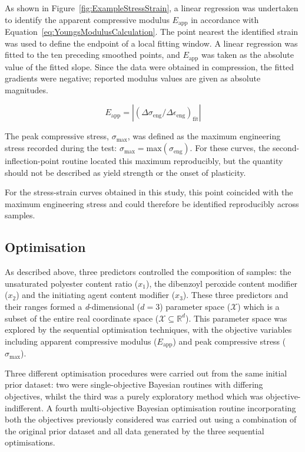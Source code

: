 As shown in Figure~\ref{fig:ExampleStressStrain}, a linear regression was
 undertaken to identify the apparent compressive modulus \(E_{\text{app}}\)
 in accordance with Equation~\ref{eq:YoungsModulusCalculation}.
The point nearest the identified strain was used to define the endpoint of a local
 fitting window.
A linear regression was fitted to the ten preceding smoothed points, and
 \(E_{\text{app}}\) was taken as the absolute value of the fitted slope.
Since the data were obtained in compression, the fitted gradients were
 negative; reported modulus values are given as absolute magnitudes.

\begin{equation}\label{eq:YoungsModulusCalculation}
    E_{\text{app}} = |(\Delta \sigma_{\text{eng}} / \Delta \epsilon_{\text{eng}})_{\text{fit}}|
\end{equation}

The peak compressive stress, \(\sigma_{\text{max}}\), was defined as the maximum
 engineering stress recorded during the test: 
 \(\sigma_{\text{max}}=\text{max}(\sigma_{\text{eng}})\).
For these curves, the second-inflection-point routine located this maximum
 reproducibly, but the quantity should not be described as yield strength or the
 onset of plasticity.

For the stress-strain curves obtained in this study, this point coincided
 with the maximum engineering stress and could therefore be identified
 reproducibly across samples.

\subsection{Optimisation}
As described above, three predictors controlled the composition of samples:
 the unsaturated polyester content ratio (\(x_{1}\)), the dibenzoyl peroxide
 content modifier (\(x_{2}\)) and the initiating agent content modifier
 (\(x_{3}\)).
These three predictors and their ranges formed a \textit{d}-dimensional 
(\(d=3\)) parameter space (\(\mathcal{X}\)) which is a subset of the entire 
 real coordinate space (\(\mathcal{X}\subseteq \mathbb{R}^{d}\)).
This parameter space was explored by the sequential optimisation techniques,
 with the objective variables including apparent compressive modulus
 (\(E_{\text{app}}\)) and peak compressive stress (\(\sigma_{\text{max}}\)).

Three different optimisation procedures were carried out from the same
 initial prior dataset: two were single-objective Bayesian routines with
 differing objectives, whilst the third was a purely exploratory method
 which was objective-indifferent.
A fourth multi-objective Bayesian optimisation routine incorporating both
 the objectives previously considered was carried out using a combination of
 the original prior dataset and all data generated by the three sequential
 optimisations.

